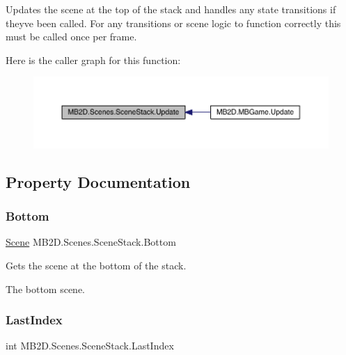 Updates the scene at the top of the stack and handles any state transitions if they\textquotesingle{}ve been called. For any transitions or scene logic to function correctly this must be called once per frame. 

Here is the caller graph for this function\+:
\nopagebreak
\begin{figure}[H]
\begin{center}
\leavevmode
\includegraphics[width=350pt]{class_m_b2_d_1_1_scenes_1_1_scene_stack_a8486b29eb65458e88512989201772984_icgraph}
\end{center}
\end{figure}


\subsection{Property Documentation}
\hypertarget{class_m_b2_d_1_1_scenes_1_1_scene_stack_a916ab93964a454fa69697bef787c79d6}{}\label{class_m_b2_d_1_1_scenes_1_1_scene_stack_a916ab93964a454fa69697bef787c79d6} 
\subsubsection{\texorpdfstring{Bottom}{Bottom}}
{\footnotesize\ttfamily \hyperlink{class_m_b2_d_1_1_scenes_1_1_scene}{Scene} M\+B2\+D.\+Scenes.\+Scene\+Stack.\+Bottom\hspace{0.3cm}{\ttfamily [get]}}



Gets the scene at the bottom of the stack. 

The bottom scene.\hypertarget{class_m_b2_d_1_1_scenes_1_1_scene_stack_a4c0fa3522458fb0d64cee1a54f31d50d}{}\label{class_m_b2_d_1_1_scenes_1_1_scene_stack_a4c0fa3522458fb0d64cee1a54f31d50d} 
\subsubsection{\texorpdfstring{Last\+Index}{LastIndex}}
{\footnotesize\ttfamily int M\+B2\+D.\+Scenes.\+Scene\+Stack.\+Last\+Index\hspace{0.3cm}{\ttfamily [get]}}



